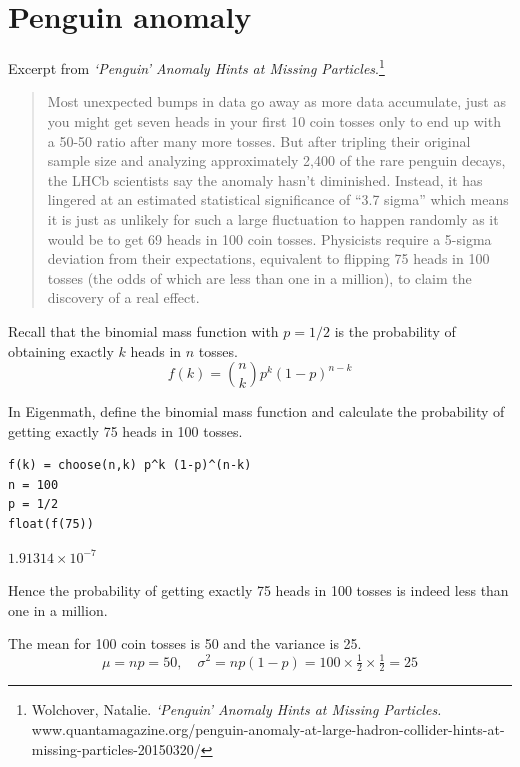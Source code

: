 

\section*{Penguin anomaly}

Excerpt from \textit{`Penguin' Anomaly Hints at Missing Particles}.\footnote{
Wolchover, Natalie.
\textit{`Penguin' Anomaly Hints at Missing Particles.}\\
www.quantamagazine.org/penguin-anomaly-at-large-hadron-collider-hints-at-missing-particles-20150320/}

\begin{quote}
Most unexpected bumps in data go away as more data accumulate, just as you might get seven heads in your first 10 coin tosses only to end up with a 50-50 ratio after many more tosses. But after tripling their original sample size and analyzing approximately 2,400 of the rare penguin decays, the LHCb scientists say the anomaly hasn't diminished. Instead, it has lingered at an estimated statistical significance of ``3.7 sigma'' which means it is just as unlikely for such a large fluctuation to happen randomly as it would be to get 69 heads in 100 coin tosses. Physicists require a 5-sigma deviation from their expectations, equivalent to flipping 75 heads in 100 tosses (the odds of which are less than one in a million), to claim the discovery of a real effect.
\end{quote}

Recall that the binomial mass function with $p=1/2$
is the probability of obtaining exactly
$k$ heads in $n$ tosses.
\begin{equation*}
f(k)=\binom{n}{k}p^k(1-p)^{n-k}
\end{equation*}

In Eigenmath, define the binomial mass function
and calculate the probability
of getting exactly 75 heads in 100 tosses.

{\color{blue}
\begin{verbatim}
f(k) = choose(n,k) p^k (1-p)^(n-k)
n = 100
p = 1/2
float(f(75))
\end{verbatim}}

$1.91314\times10^{-7}$

\bigskip
Hence the probability of getting exactly 75 heads in 100 tosses is indeed
less than one in a million.

\bigskip
The mean for 100 coin tosses is 50 and the variance is 25.
\begin{equation*}
\mu=np=50,\quad\sigma^2=np(1-p)=100\times\tfrac{1}{2}\times\tfrac{1}{2}=25
\end{equation*}

